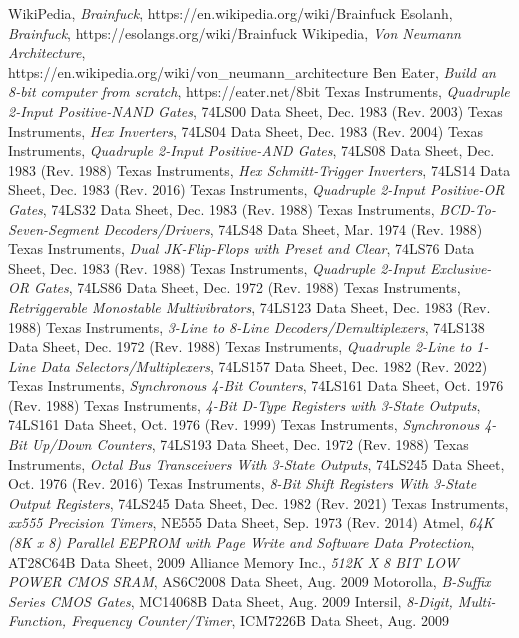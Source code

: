 \begin{thebibliography}{99} \label{resources}
 WikiPedia, \emph{Brainfuck}, https://en.wikipedia.org/wiki/Brainfuck
 Esolanh, \emph{Brainfuck}, https://esolangs.org/wiki/Brainfuck
 Wikipedia, \emph{Von Neumann Architecture},\\https://en.wikipedia.org/wiki/von\_neumann\_architecture
 Ben Eater, \emph{Build an 8-bit computer from scratch}, https://eater.net/8bit
 Texas Instruments, \emph{Quadruple 2-Input Positive-NAND Gates}, 74LS00 Data Sheet, Dec. 1983 (Rev. 2003)
 Texas Instruments, \emph{Hex Inverters}, 74LS04 Data Sheet, Dec. 1983 (Rev. 2004)
 Texas Instruments, \emph{Quadruple 2-Input Positive-AND Gates}, 74LS08 Data Sheet, Dec. 1983 (Rev. 1988)
 Texas Instruments, \emph{Hex Schmitt-Trigger Inverters}, 74LS14 Data Sheet, Dec. 1983 (Rev. 2016)
 Texas Instruments, \emph{Quadruple 2-Input Positive-OR Gates}, 74LS32 Data Sheet, Dec. 1983 (Rev. 1988)
 Texas Instruments, \emph{BCD-To-Seven-Segment Decoders/Drivers}, 74LS48 Data Sheet, Mar. 1974 (Rev. 1988)
 Texas Instruments, \emph{Dual JK-Flip-Flops with Preset and Clear}, 74LS76 Data Sheet, Dec. 1983 (Rev. 1988)
 Texas Instruments, \emph{Quadruple 2-Input Exclusive-OR Gates}, 74LS86 Data Sheet, Dec. 1972 (Rev. 1988)
 Texas Instruments, \emph{Retriggerable Monostable Multivibrators}, 74LS123 Data Sheet, Dec. 1983 (Rev. 1988)
 Texas Instruments, \emph{3-Line to 8-Line Decoders/Demultiplexers}, 74LS138 Data Sheet, Dec. 1972 (Rev. 1988)
 Texas Instruments, \emph{Quadruple 2-Line to 1-Line Data Selectors/Multiplexers}, 74LS157 Data Sheet, Dec. 1982 (Rev. 2022)
 Texas Instruments, \emph{Synchronous 4-Bit Counters}, 74LS161 Data Sheet, Oct. 1976 (Rev. 1988)
 Texas Instruments, \emph{4-Bit D-Type Registers with 3-State Outputs}, 74LS161 Data Sheet, Oct. 1976 (Rev. 1999)
 Texas Instruments, \emph{Synchronous 4-Bit Up/Down Counters}, 74LS193 Data Sheet, Dec. 1972 (Rev. 1988)
 Texas Instruments, \emph{Octal Bus Transceivers With 3-State Outputs}, 74LS245 Data Sheet, Oct. 1976 (Rev. 2016)
 Texas Instruments, \emph{8-Bit Shift Registers With 3-State Output Registers}, 74LS245 Data Sheet, Dec. 1982 (Rev. 2021)
 Texas Instruments, \emph{xx555 Precision Timers}, NE555 Data Sheet, Sep. 1973 (Rev. 2014)
 Atmel, \emph{64K (8K x 8) Parallel EEPROM with Page Write and Software Data Protection}, AT28C64B Data Sheet, 2009
 Alliance Memory Inc., \emph{512K X 8 BIT LOW POWER CMOS SRAM}, AS6C2008 Data Sheet, Aug. 2009
 Motorolla, \emph{B-Suffix Series CMOS Gates}, MC14068B Data Sheet, Aug. 2009
 Intersil, \emph{8-Digit, Multi-Function, Frequency Counter/Timer}, ICM7226B Data Sheet, Aug. 2009
  

\end{thebibliography}

